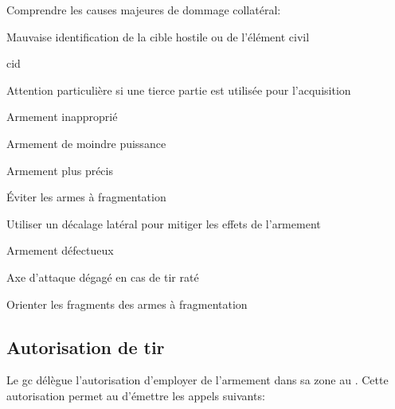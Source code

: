 \begin{e1}
	\item Comprendre les causes majeures de dommage collatéral:
	\begin{e2}
		\item Mauvaise identification de la cible hostile ou de l'élément civil
		\begin{e3}
			\item \gls{cid}
			\item Attention particulière si une tierce partie est utilisée pour l'acquisition
		\end{e3}
		\item Armement inapproprié
		\begin{e3}
			\item Armement de moindre puissance
			\item Armement plus précis
			\item Éviter les armes à fragmentation
			\item Utiliser un décalage latéral pour mitiger les effets de l'armement
		\end{e3}
		\item Armement défectueux
		\begin{e3}
			\item Axe d'attaque dégagé en cas de tir raté
			\item Orienter les fragments des armes à fragmentation
		\end{e3}
	\end{e2}
\end{e1}


\newpage
\subsection{Autorisation de tir}

Le \gls{gc} délègue l'autorisation d'employer de l'armement dans sa zone au \ja{}. Cette autorisation permet au \ja{} d'émettre les appels suivants:


\begin{e1}
	\item {} 
	\item {}
	\item {}
	\item {}
	\item {}
\end{e1}

